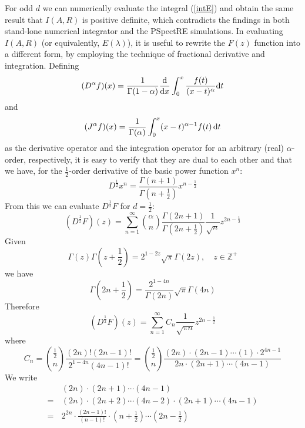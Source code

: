 \documentclass{report}
\begin{document}
For odd $d$ we can numerically evaluate the integral (\ref{intE}) and obtain the same result that $I(A,R)$ is positive definite, which contradicts the findings in both stand-lone numerical integrator and the PSpectRE simulations. In evaluating $I(A,R)$ (or equivalently, $E(\lambda)$), it is useful to rewrite the $F(z)$ function into a different form, by employing the technique of fractional derivative and integration. Defining
\begin{equation}
  (D^\alpha f)(x)= \frac{1}{\Gamma(1-\alpha)}\frac{\rm d}{{\rm d}x}\int^x_0
  \frac{f(t)}{(x-t)^\alpha}{\rm d}t
\end{equation}
and
\begin{equation}
  (J^\alpha f)(x) = \frac{1}{\Gamma(\alpha)}\int^x_0(x-t)^{\alpha-1}f(t)\,{\rm d}t
\end{equation}
as the derivative operator and the integration operator for an arbitrary (real) $\alpha$-order, respectively, it is easy to verify that they are dual to each other and that we have, for the $\frac{1}{2}$-order derivative of the basic power function $x^n$:
\begin{equation}
  D^\frac{1}{2} x^n = \frac{\Gamma(n+1)}{\Gamma(n+\frac{1}{2})} x^{n-\frac{1}{2}}
\end{equation}
From this we can evaluate $D^\frac{1}{2} F$ for $d=\frac{1}{2}$:
\begin{equation}
  (D^\frac{1}{2} F)(z) = \sum^\infty_{n=1} \binom{\alpha}{n} \frac{\Gamma(2n+1)}{\Gamma(2n+\frac{1}{2})}\frac{1}{\sqrt{n}}z^{2n-\frac{1}{2}}
\end{equation}
Given
\begin{equation}
  \Gamma(z)\Gamma(z+\frac{1}{2})=2^{1-2z}\sqrt{\pi}\Gamma(2z),\quad z\in\mathbb{Z}^+
\end{equation}
we have
\begin{equation}
  \Gamma(2n+\frac{1}{2}) = \frac{2^{1-4n}}{\Gamma(2n)}\sqrt{\pi}\Gamma(4n)
\end{equation}
Therefore
\begin{equation}
  (D^\frac{1}{2}F)(z) = \sum^\infty_{n=1} C_n \frac{1}{\sqrt{\pi n}} z^{2n-\frac{1}{2}}
\end{equation}
where
\begin{equation}
  C_n = \binom{\frac{1}{2}}{n} \frac{(2n)!(2n-1)!}{2^{1-4n} (4n-1)!} =\binom{\frac{1}{2}}{n} \frac{(2n)\cdot(2n-1)\cdots(1)\cdot2^{4n-1}}{2n\cdot(2n+1)\cdots(4n-1)}
\end{equation}
We write
\begin{equation}
  \begin{split}
    &(2n)\cdot(2n+1)\cdots(4n-1)\\
    =\,&(2n)\cdot(2n+2)\cdots(4n-2) \cdot (2n+1)\cdots(4n-1) \\
    =\,& 2^{2n}\cdot \frac{(2n-1)!}{(n-1)!}\cdot\left(n+\frac{1}{2}\right)\cdots\left(2n-\frac{1}{2}\right)
  \end{split}
\end{equation}
\end{document}
